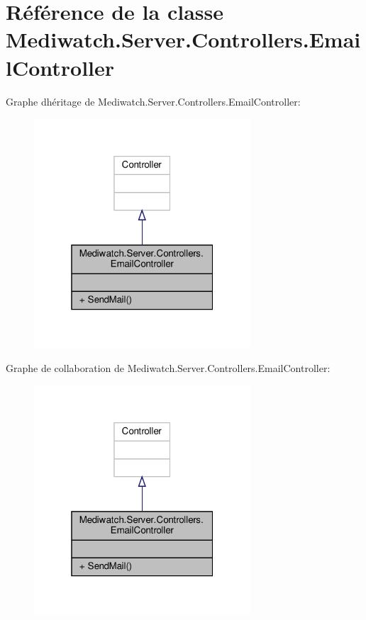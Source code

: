 \hypertarget{class_mediwatch_1_1_server_1_1_controllers_1_1_email_controller}{}\section{Référence de la classe Mediwatch.\+Server.\+Controllers.\+Email\+Controller}
\label{class_mediwatch_1_1_server_1_1_controllers_1_1_email_controller}


Graphe d\textquotesingle{}héritage de Mediwatch.\+Server.\+Controllers.\+Email\+Controller\+:\nopagebreak
\begin{figure}[H]
\begin{center}
\leavevmode
\includegraphics[width=229pt]{class_mediwatch_1_1_server_1_1_controllers_1_1_email_controller__inherit__graph}
\end{center}
\end{figure}


Graphe de collaboration de Mediwatch.\+Server.\+Controllers.\+Email\+Controller\+:\nopagebreak
\begin{figure}[H]
\begin{center}
\leavevmode
\includegraphics[width=229pt]{class_mediwatch_1_1_server_1_1_controllers_1_1_email_controller__coll__graph}
\end{center}
\end{figure}
